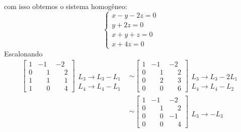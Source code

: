 \begin{exemplos}
\begin{enumerate}
\begin{solucao}
\begin{align*}
        \end{align*}
        com isso obtemos o sistema homogêneo:
        \[
          \begin{cases}
            x - y - 2z = 0\\
            y + 2z = 0\\
            x + y + z = 0\\
            x + 4z = 0
          \end{cases}
        \]
        Escalonando
        \begin{align*}
          \begin{bmatrix}
            1 & -1 & -2\\
            0 & \phantom{-} 1 & \phantom{-} 2\\
            1 & \phantom{-} 1 & \phantom{-} 1\\
            1 & \phantom{-} 0 & \phantom{-} 4
          \end{bmatrix}
          \begin{array}{l}
            \phantom{x}\\\phantom{x}\\L_3 \to L_3 - L_1\\L_4 \to L_4 - L_1
          \end{array}&\sim
          \begin{bmatrix}
            1 & -1 & -2\\
            0 & \phantom{-} 1 & \phantom{-} 2\\
            0 & \phantom{-} 2 & \phantom{-} 3\\
            0 & \phantom{-} 0 & \phantom{-} 6
          \end{bmatrix}
          \begin{array}{l}
            \phantom{x}\\\phantom{x}\\L_3 \to L_3 - 2L_1\\L_4 \to L_4 - L_2
          \end{array}\\&\sim
          \begin{bmatrix}
            1 & -1 & -2\\
            0 & \phantom{-} 1 & \phantom{-} 2\\
            0 & \phantom{-} 0 & -1\\
            0 & \phantom{-} 0 & \phantom{-} 4
          \end{bmatrix}
          \begin{array}{l}
            \phantom{x}\\\phantom{x}\\L_3 \to -L_3\\\phantom{x}

\end{array}
\end{align*}
\end{solucao}
\end{enumerate}
\end{exemplos}
